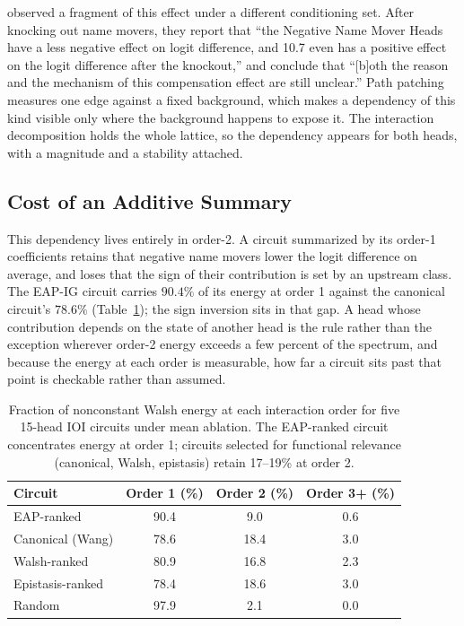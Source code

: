 \documentclass{article}
\begin{document}
\citet{wang2022ioi} observed a fragment of this effect under a different conditioning set.
After knocking out name movers, they report that ``the Negative Name Mover Heads have a less
negative effect on logit difference, and 10.7 even has a positive effect on the logit
difference after the knockout,'' and conclude that ``[b]oth the reason and the mechanism of
this compensation effect are still unclear.'' Path patching measures one edge against a
fixed background, which makes a dependency of this kind visible only where the background
happens to expose it. The interaction decomposition holds the whole lattice, so the
dependency appears for both heads, with a magnitude and a stability attached.

\subsection{Cost of an Additive Summary}

This dependency lives entirely in order-2. A circuit summarized by its order-1 coefficients
retains that negative name movers lower the logit difference on average, and loses that the
sign of their contribution is set by an upstream class. The EAP-IG circuit
carries $90.4\%$ of its energy at order 1 against the canonical circuit's $78.6\%$
(Table~\ref{tab:energy}); the sign inversion sits in that gap. A head whose contribution depends on the state of another head is the rule rather than the exception wherever order-2 energy exceeds a few percent of the spectrum, and because the energy at each order is measurable, how far a circuit sits past that point is checkable rather than assumed.

\begin{table}[h]
\centering
\begin{tabular}{lccc}
\toprule
Circuit & Order 1 (\%) & Order 2 (\%) & Order 3{+} (\%) \\
\midrule
EAP-ranked           & 90.4 & 9.0  & 0.6 \\
Canonical (Wang)     & 78.6 & 18.4 & 3.0 \\
Walsh-ranked         & 80.9 & 16.8 & 2.3 \\
Epistasis-ranked     & 78.4 & 18.6 & 3.0 \\
Random               & 97.9 & 2.1  & 0.0 \\
\bottomrule
\end{tabular}
\caption{Fraction of nonconstant Walsh energy at each interaction order
for five 15-head IOI circuits under mean ablation. The EAP-ranked circuit
concentrates energy at order 1; circuits selected for functional relevance
(canonical, Walsh, epistasis) retain 17--19\% at order 2.}
\label{tab:energy}
\end{table}
\end{document}
